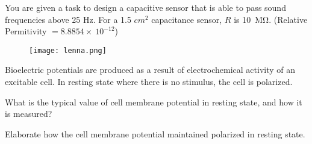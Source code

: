 \documentclass[12pt]{article}
\begin{document}
		

	\listclose %
	
	\item You are given a task to design a capacitive sensor that is able to pass sound frequencies above 25 Hz. For a 1.5 $cm^2$ capacitance sensor, $R$ is 10~\si{\mega\ohm}. (Relative Permitivity $= 8.8854 \times~10^{-12}$)
	
	
	\begin{figure}[H] %
		\centering
		\texttt{[image: lenna.png]}
		\caption{\rajah}
		\label{fig:diffamp}
	\end{figure}
	
\listclose %



\clearpage		%
\question{}

\listbeginx	%
	\item Bioelectric potentials are produced as a result of electrochemical activity of an excitable cell. In resting state where there is no stimulus, the cell is polarized.
	
	
	\listbegin
		\item What is the typical value of cell membrane potential in resting state, and how it is measured?
		
		
		
		\item Elaborate how the cell membrane potential maintained polarized in resting state.
		
\end{document}
